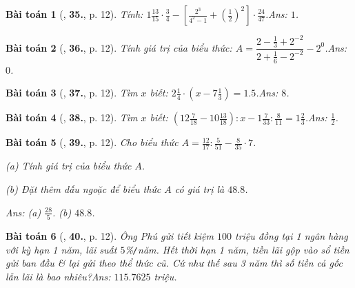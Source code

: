 \documentclass{article}
\numberwithin{equation}{section}
\newtheorem{baitoan}{Bài toán}
\begin{document}
\begin{baitoan}[\cite{Tuyen_Toan_7}, \textbf{35.}, p. 12]
	Tính: $1\frac{13}{15}\cdot\frac{3}{4} - \left[\frac{2^3}{4^2 - 1} + \left(\frac{1}{2}\right)^2\right]\cdot\frac{24}{47}$.\hfill\textsf{Ans:} $1$.
\end{baitoan}

\begin{baitoan}[\cite{Tuyen_Toan_7}, \textbf{36.}, p. 12]
	Tính giá trị của biểu thức: $A = \dfrac{2 - \frac{1}{3} + 2^{-2}}{2 + \frac{1}{6} - 2^{-2}} - 2^0$.\hfill\textsf{Ans:} $0$.
\end{baitoan}

\begin{baitoan}[\cite{Tuyen_Toan_7}, \textbf{37.}, p. 12]
	Tìm $x$ biết: $2\frac{1}{4}\cdot\left(x - 7\frac{1}{3}\right) = 1.5$.\hfill\textsf{Ans:} $8$.
\end{baitoan}

\begin{baitoan}[\cite{Tuyen_Toan_7}, \textbf{38.}, p. 12]
	Tìm $x$ biết: $\left(12\frac{7}{18} - 10\frac{13}{18}\right):x - 1\frac{7}{33}:\frac{8}{11} = 1\frac{2}{3}$.\hfill\textsf{Ans:} $\frac{1}{2}$.
\end{baitoan}

\begin{baitoan}[\cite{Tuyen_Toan_7}, \textbf{39.}, p. 12]
	Cho biểu thức $A = \frac{12}{17}:\frac{5}{51} - \frac{8}{35}\cdot 7$.
	\begin{enumerate*}
		\item[(a)] Tính giá trị của biểu thức $A$.
		\item[(b)] Đặt thêm dấu ngoặc để biểu thức $A$ có giá trị là $48.8$.
	\end{enumerate*}\hfill\textsf{Ans:} (a) $\frac{28}{5}$. (b) $48.8$.
\end{baitoan}

\begin{baitoan}[\cite{Tuyen_Toan_7}, \textbf{40.}, p. 12]
	Ông Phú gửi tiết kiệm $100$ triệu đồng tại 1 ngân hàng với kỳ hạn 1 năm, lãi suất $5$\%\emph{\texttt{/}}năm. Hết thời hạn 1 năm, tiền lãi gộp vào sổ tiền gửi ban đầu \& lại gửi theo thể thức cũ. Cứ như thế sau 3 năm thì số tiền cả gốc lẫn lãi là bao nhiêu?\hfill\textsf{Ans:} $115.7625$ triệu.
\end{baitoan}

\end{document}
